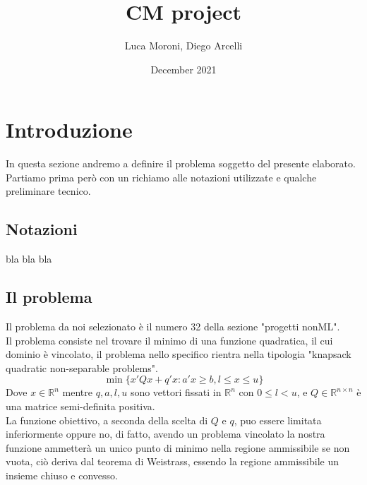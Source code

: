 \documentclass{article}
\title{CM project}
\author{Luca Moroni, Diego Arcelli}
\date{December 2021}
\begin{document}
\maketitle

\section{Introduzione}
In questa sezione andremo a definire il problema soggetto del presente elaborato.\\
Partiamo prima però con un richiamo alle notazioni utilizzate e qualche preliminare tecnico.
\subsection{Notazioni}
bla bla bla
\subsection{Il problema}
Il problema da noi selezionato è il numero 32 della sezione "progetti nonML".\\
Il problema consiste nel trovare il minimo di una funzione quadratica, il cui dominio è vincolato, il problema nello specifico rientra nella tipologia "knapsack quadratic non-separable problems".\\
\[\min \{x'Qx + q'x : a'x \geq b, l \leq x \leq u\}\]
Dove $x \in \mathbb{R}^n$ mentre $q, a, l, u$  sono vettori fissati in $\mathbb{R}^n$ con $0 \leq l < u$, e $Q \in \mathbb{R}^{n \times n}$ è una matrice semi-definita positiva.\\
La funzione obiettivo, a seconda della scelta di $Q$ e $q$, puo essere limitata inferiormente oppure no, di fatto, avendo un problema vincolato la nostra funzione ammetterà un unico punto di minimo nella regione ammissibile se non vuota, ciò deriva dal teorema di Weistrass, essendo la regione ammissibile un insieme chiuso e convesso.
\end{document}
